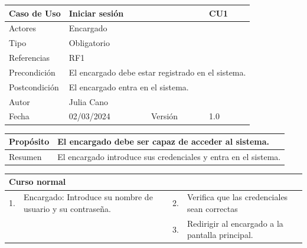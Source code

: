 \begin{table}[H]
	\centering
	\begin{tabular}{| m{} | m{} | m{} | m{} |}
		\hline
		\rowcolor{grayshade} Caso de Uso & \multicolumn{2}{|m{0.43\textwidth}|}{Iniciar sesión} &  CU1\\ 
		\hline
		Actores & \multicolumn{3}{l|}{Encargado} \\ 
		\hline
		Tipo & \multicolumn{3}{l|}{Obligatorio} \\ 
		\hline
		Referencias & \multicolumn{3}{l|}{RF1} \\ 
		\hline
		Precondición & \multicolumn{3}{l|}{El encargado debe estar registrado en el sistema.} \\ 
		\hline
		Postcondición & \multicolumn{3}{l|}{El encargado entra en el sistema.} \\ 
		\hline
		Autor & \multicolumn{3}{l|}{Julia Cano} \\ 
		\hline
		Fecha & 02/03/2024 & Versión & 1.0 \\
		\hline
	\end{tabular}
\end{table}

\begin{table}[H]
	\centering
	\begin{tabular}{| m{} | m{} | m{} | m{} |}
		\hline
		Propósito & \multicolumn{3}{m{0.67\textwidth}|}{El encargado debe ser capaz de acceder al sistema.}   \\ 
		\hline
		Resumen & \multicolumn{3}{m{0.67\textwidth}|}{El encargado introduce sus credenciales y entra en el sistema.} \\ 
		\hline
	\end{tabular}
\end{table}

\begin{table}[H]
	\centering
	\begin{tabular}{| m{} | m{} | m{} | m{} |}
		\hline
		\multicolumn{4}{|m{0.9\textwidth}|}{Curso normal}     \\ 
		\hline
		1. & Encargado: Introduce su nombre de usuario y su contraseña. & 2. &  Verifica que las credenciales sean correctas \\ 
		\hline
		& & 3. & Redirigir al encargado a la pantalla principal. \\ 
		\hline
	\end{tabular}
\end{table}

